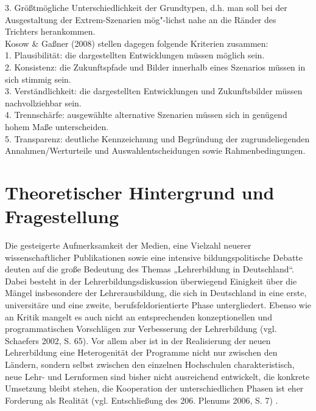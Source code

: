 \documentclass[12pt,a4paper]{article}
\begin{document}
3. Größtmögliche Unterschiedlichkeit der Grundtypen, d.h. man soll bei der Ausgestaltung der Extrem-Szenarien mög"-lichst nahe an die Ränder des Trichters herankommen.\\

Kosow \& Gaßner (2008) stellen dagegen folgende Kriterien zusammen: \\

1. Plausibilität: die dargestellten Entwicklungen müssen möglich sein.\\ 

2. Konsistenz: die Zukunftspfade und Bilder innerhalb eines Szenarios müssen in sich stimmig sein. \\

3. Verständlichkeit: die dargestellten Entwicklungen und Zukunftsbilder müssen nachvollziehbar sein. \\

4. Trennschärfe: ausgewählte alternative Szenarien müssen sich in genügend hohem Maße unterscheiden.\\
 
5. Transparenz: deutliche Kennzeichnung und Begründung der zugrundeliegenden Annahmen/Werturteile und Auswahlentscheidungen sowie Rahmenbedingungen. 
\pagebreak

\section{Theoretischer Hintergrund und Fragestellung} 

Die gesteigerte Aufmerksamkeit der Medien, eine Vielzahl neuerer wissenschaftlicher Publikationen sowie eine intensive bildungspolitische Debatte deuten auf die große Bedeutung des Themas „Lehrerbildung in Deutschland“. Dabei besteht in der Lehrerbildungsdiskussion überwiegend Einigkeit über die Mängel insbesondere der Lehrerausbildung, die sich in Deutschland in eine erste, universitäre und eine zweite, berufsfeldorientierte Phase untergliedert. Ebenso wie an Kritik mangelt es auch nicht an entsprechenden konzeptionellen und programmatischen Vorschlägen zur Verbesserung der Lehrerbildung (vgl. Schaefers 2002, S. 65)\cite{Christine2002}. Vor allem aber ist in der Realisierung der neuen Lehrerbildung eine Heterogenität der Programme nicht nur zwischen den Ländern, sondern selbst zwischen den einzelnen Hochschulen charakteristisch, neue Lehr- und Lernformen sind bisher nicht ausreichend entwickelt, die konkrete Umsetzung bleibt stehen, die Kooperation der unterschiedlichen Phasen ist eher Forderung als Realität (vgl. Entschließung des 206. Plenums 2006, S. 7) \cite{Hochschulrektorenkonferenz2006}. 
 
\end{document}
